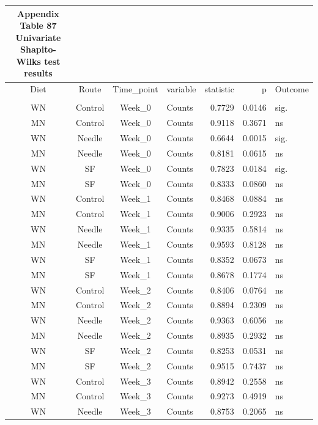 \documentclass[
  12pt,
  letterpaper,
]{article}
\begin{document}
\begingroup
\fontsize{12.0pt}{14.4pt}\selectfont
\begin{longtable}{ccclrrl}
\caption*{
{\large \textbf{Appendix Table 87}} \\ 
{\small \textbf{Univariate Shapito-Wilks test results}}
} \\ 
\toprule
{Diet} & {Route} & Time\_point & {variable} & {statistic} & {p} & {Outcome} \\ 
\midrule\addlinespace[2.5pt]
\multicolumn{7}{l}{Pre-Infection} \\[2.5pt] 
\midrule\addlinespace[2.5pt]
WN & Control & Week\_0 & Counts & 0.7729 & 0.0146 & sig. \\ 
MN & Control & Week\_0 & Counts & 0.9118 & 0.3671 & ns \\ 
WN & Needle & Week\_0 & Counts & 0.6644 & 0.0015 & sig. \\ 
MN & Needle & Week\_0 & Counts & 0.8181 & 0.0615 & ns \\ 
WN & SF & Week\_0 & Counts & 0.7823 & 0.0184 & sig. \\ 
MN & SF & Week\_0 & Counts & 0.8333 & 0.0860 & ns \\ 
WN & Control & Week\_1 & Counts & 0.8468 & 0.0884 & ns \\ 
MN & Control & Week\_1 & Counts & 0.9006 & 0.2923 & ns \\ 
WN & Needle & Week\_1 & Counts & 0.9335 & 0.5814 & ns \\ 
MN & Needle & Week\_1 & Counts & 0.9593 & 0.8128 & ns \\ 
WN & SF & Week\_1 & Counts & 0.8352 & 0.0673 & ns \\ 
MN & SF & Week\_1 & Counts & 0.8678 & 0.1774 & ns \\ 
WN & Control & Week\_2 & Counts & 0.8406 & 0.0764 & ns \\ 
MN & Control & Week\_2 & Counts & 0.8894 & 0.2309 & ns \\ 
WN & Needle & Week\_2 & Counts & 0.9363 & 0.6056 & ns \\ 
MN & Needle & Week\_2 & Counts & 0.8935 & 0.2932 & ns \\ 
WN & SF & Week\_2 & Counts & 0.8253 & 0.0531 & ns \\ 
MN & SF & Week\_2 & Counts & 0.9515 & 0.7437 & ns \\ 
WN & Control & Week\_3 & Counts & 0.8942 & 0.2558 & ns \\ 
MN & Control & Week\_3 & Counts & 0.9273 & 0.4919 & ns \\ 
WN & Needle & Week\_3 & Counts & 0.8753 & 0.2065 & ns \\ 

\end{longtable}
\end{document}
